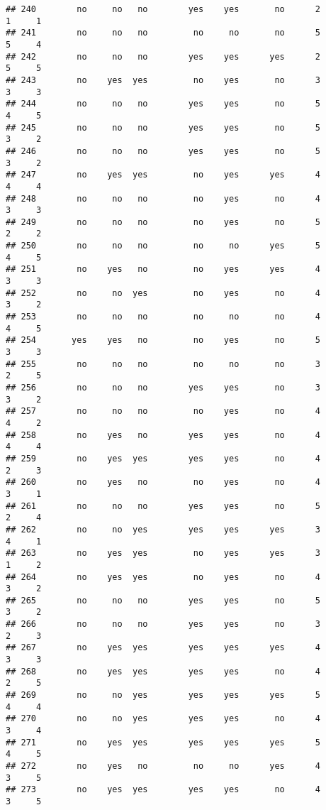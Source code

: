 \documentclass[]{article}
\begin{document}
\begin{verbatim}
## 240        no     no   no        yes    yes       no      2        1     1
## 241        no     no   no         no     no       no      5        5     4
## 242        no     no   no        yes    yes      yes      2        5     5
## 243        no    yes  yes         no    yes       no      3        3     3
## 244        no     no   no        yes    yes       no      5        4     5
## 245        no     no   no        yes    yes       no      5        3     2
## 246        no     no   no        yes    yes       no      5        3     2
## 247        no    yes  yes         no    yes      yes      4        4     4
## 248        no     no   no         no    yes       no      4        3     3
## 249        no     no   no         no    yes       no      5        2     2
## 250        no     no   no         no     no      yes      5        4     5
## 251        no    yes   no         no    yes      yes      4        3     3
## 252        no     no  yes         no    yes       no      4        3     2
## 253        no     no   no         no     no       no      4        4     5
## 254       yes    yes   no         no    yes       no      5        3     3
## 255        no     no   no         no     no       no      3        2     5
## 256        no     no   no        yes    yes       no      3        3     2
## 257        no     no   no         no    yes       no      4        4     2
## 258        no    yes   no        yes    yes       no      4        4     4
## 259        no    yes  yes        yes    yes       no      4        2     3
## 260        no    yes   no         no    yes       no      4        3     1
## 261        no     no   no        yes    yes       no      5        2     4
## 262        no     no  yes        yes    yes      yes      3        4     1
## 263        no    yes  yes         no    yes      yes      3        1     2
## 264        no    yes  yes         no    yes       no      4        3     2
## 265        no     no   no        yes    yes       no      5        3     2
## 266        no     no   no        yes    yes       no      3        2     3
## 267        no    yes  yes        yes    yes      yes      4        3     3
## 268        no    yes  yes        yes    yes       no      4        2     5
## 269        no     no  yes        yes    yes      yes      5        4     4
## 270        no     no  yes        yes    yes       no      4        3     4
## 271        no    yes  yes        yes    yes      yes      5        4     5
## 272        no    yes   no         no     no      yes      4        3     5
## 273        no    yes  yes        yes    yes       no      4        3     5

\end{verbatim}
\end{document}
